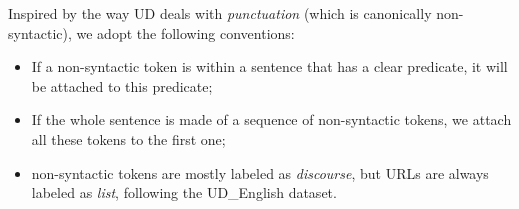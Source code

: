 \documentclass[11pt,a4paper]{article}
\newcommand{\yjcomment}[1]{\textcolor{orange}{[$_\mathrm{L}^\mathrm{Y}$#1]}}
\begin{document}
Inspired by the way UD deals with \emph{punctuation} (which is
canonically non-syntactic), we adopt the following
conventions:
\begin{itemize}
\item If a non-syntactic token is within a sentence that has a clear predicate, it will be attached to this predicate;
\item If the whole sentence is made of a sequence of non-syntactic tokens, we attach all these tokens to the first one;
\item non-syntactic tokens are mostly labeled as {\it discourse}, but
  URLs are always labeled as {\it list}, following the UD\_English dataset.
\end{itemize}




\end{document}
